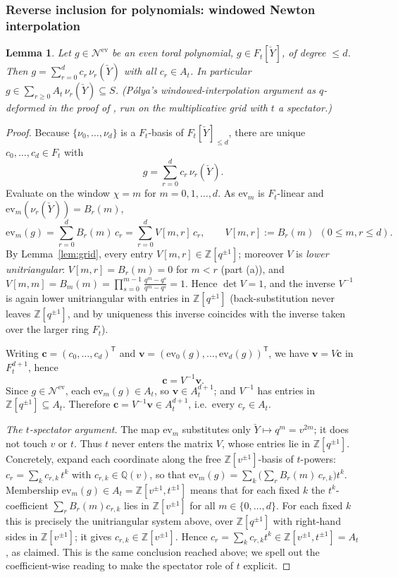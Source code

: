 \documentclass[11pt]{article}
\newtheorem{lemma}{Lemma}
\newcommand{\At}{A_t}
\newcommand{\Ft}{F_t}
\newcommand{\Nev}{\mathcal N^{\mathrm{ev}}}
\newcommand{\Yc}{\check Y}
\newcommand{\Z}{\mathbb Z}
\newcommand{\ev}{\mathrm{ev}}
\begin{document}
\subsubsection{Reverse inclusion for polynomials: windowed Newton interpolation}

\begin{lemma}\label{lem:rev}
Let $g\in\Nev$ be an even toral \emph{polynomial}, $g\in\Ft[\Yc]$, of degree
$\le d$. Then $g=\sum_{r=0}^{d}c_r\,\nu_r(\Yc)$ with all $c_r\in\At$. In
particular $g\in\sum_{r\ge0}\At\,\nu_r(\Yc)\subseteq S$.
(P\'olya's windowed-interpolation argument as $q$-deformed in the proof of
\cite[\S1]{HarmanHopkins}, run on the multiplicative grid with $t$ a
spectator.)
\end{lemma}

\begin{proof}
Because $\{\nu_0,\dots,\nu_d\}$ is a $\Ft$-basis of $\Ft[\Yc]_{\le d}$, there are
unique $c_0,\dots,c_d\in\Ft$ with
\[
  g=\sum_{r=0}^{d}c_r\,\nu_r(\Yc).
\]
Evaluate on the window $\chi=m$ for $m=0,1,\dots,d$. As $\ev_m$ is
$\Ft$-linear and $\ev_m(\nu_r(\Yc))=B_r(m)$,
\[
  \ev_m(g)=\sum_{r=0}^{d}B_r(m)\,c_r
  =\sum_{r=0}^{d}V[m,r]\,c_r,
  \qquad V[m,r]:=B_r(m)\ \ (0\le m,r\le d).
\]
By Lemma~\ref{lem:grid}, every entry $V[m,r]\in\Z[q^{\pm1}]$; moreover $V$ is
\emph{lower unitriangular}: $V[m,r]=B_r(m)=0$ for $m<r$ (part (a)), and
$V[m,m]=B_m(m)=\prod_{s=0}^{m-1}\frac{q^{m}-q^{s}}{q^{m}-q^{s}}=1$. Hence
$\det V=1$, and the inverse $V^{-1}$ is again lower unitriangular with entries in
$\Z[q^{\pm1}]$ (back-substitution never leaves $\Z[q^{\pm1}]$, and by uniqueness
this inverse coincides with the inverse taken over the larger ring $\Ft$).

Writing $\mathbf c=(c_0,\dots,c_d)^{\mathsf T}$ and
$\mathbf v=(\ev_0(g),\dots,\ev_d(g))^{\mathsf T}$, we have $\mathbf v=V\mathbf c$
in $\Ft^{d+1}$, hence
\[
  \mathbf c=V^{-1}\mathbf v .
\]
Since $g\in\Nev$, each $\ev_m(g)\in\At$, so $\mathbf v\in\At^{d+1}$; and
$V^{-1}$ has entries in $\Z[q^{\pm1}]\subseteq\At$. Therefore
$\mathbf c=V^{-1}\mathbf v\in\At^{d+1}$, i.e.\ every $c_r\in\At$.

\smallskip
\emph{The $t$-spectator argument.}\;
The map $\ev_m$ substitutes only $\Yc\mapsto q^{m}=v^{2m}$; it does not touch $v$
or $t$. Thus $t$ never enters the matrix $V$, whose entries lie in
$\Z[q^{\pm1}]$. Concretely, expand each coordinate along the free
$\Z[v^{\pm1}]$-basis of $t$-powers: $c_r=\sum_{k}c_{r,k}\,t^{k}$ with
$c_{r,k}\in\mathbb Q(v)$, so that
$\ev_m(g)=\sum_{k}\bigl(\sum_{r}B_r(m)\,c_{r,k}\bigr)t^{k}$. Membership
$\ev_m(g)\in\At=\Z[v^{\pm1},t^{\pm1}]$ means that for each fixed $k$ the
$t^{k}$-coefficient $\sum_r B_r(m)c_{r,k}$ lies in $\Z[v^{\pm1}]$ for all
$m\in\{0,\dots,d\}$. For each fixed $k$ this is precisely the unitriangular
system above, over $\Z[q^{\pm1}]$ with right-hand sides in $\Z[v^{\pm1}]$; it
gives $c_{r,k}\in\Z[v^{\pm1}]$. Hence
$c_r=\sum_k c_{r,k}t^{k}\in\Z[v^{\pm1},t^{\pm1}]=\At$, as claimed. This is the
same conclusion reached above; we spell out the coefficient-wise reading to make
the spectator role of $t$ explicit.


\end{proof}
\end{document}
